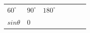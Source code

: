 {{\begin{center}
\begin{tabular}[t]{|l|l|l|l|l|l|l|}
    
        
                  \begin{math}{60}^{\circ }\end{math}
                 &
    
    
        
                  \begin{math}{90}^{\circ }\end{math}
                 &
    
    
        
                  \begin{math}{180}^{\circ }\end{math}
     \tabularnewline\cline{1-1}\cline{2-2}\cline{3-3}\cline{4-4}\cline{5-5}\cline{6-6}\cline{7-7}
    
    
        
                  \begin{math}sin\theta \end{math}
                 &
    
    
        0 &
    
    
        

\end{tabular}
\end{center}}}
